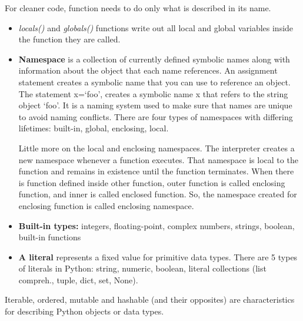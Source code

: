 \documentclass[
  letterpaper,
  DIV=11,
  numbers=noendperiod]{scrreprt}
\begin{document}
\begin{tcolorbox}[enhanced jigsaw, opacitybacktitle=0.6, colback=white, bottomrule=.15mm, coltitle=black, opacityback=0, breakable, rightrule=.15mm, colframe=quarto-callout-tip-color-frame, arc=.35mm, titlerule=0mm, colbacktitle=quarto-callout-tip-color!10!white, toptitle=1mm, bottomtitle=1mm, leftrule=.75mm, toprule=.15mm, title=\textcolor{quarto-callout-tip-color}{\faLightbulb}\hspace{0.5em}{Tip}, left=2mm]

For cleaner code, function needs to do only what is described in its
name.

\end{tcolorbox}

\begin{itemize}
\item
  \emph{locals()} and \emph{globals()} functions write out all local and
  global variables inside the function they are called.
\item
  \textbf{Namespace} is a collection of currently defined symbolic names
  along with information about the object that each name references. An
  assignment statement creates a symbolic name that you can use to
  reference an object. The statement x=`foo', creates a symbolic name x
  that refers to the string object `foo'. It is a naming system used to
  make sure that names are unique to avoid naming conflicts. There are
  four types of namespaces with differing lifetimes: built-in, global,
  enclosing, local.

  Little more on the local and enclosing namespaces. The interpreter
  creates a new namespace whenever a function executes. That namespace
  is local to the function and remains in existence until the function
  terminates. When there is function defined inside other function,
  outer function is called enclosing function, and inner is called
  enclosed function. So, the namespace created for enclosing function is
  called enclosing namespace.
\item
  \textbf{Built-in types:} integers, floating-point, complex numbers,
  strings, boolean, built-in functions
\item
  \textbf{A literal} represents a fixed value for primitive data types.
  There are 5 types of literals in Python: string, numeric, boolean,
  literal collections (list compreh., tuple, dict, set, None).
\end{itemize}

Iterable, ordered, mutable and hashable (and their opposites) are
characteristics for describing Python objects or data types.
\end{document}
